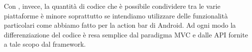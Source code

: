     Con \tisdk{}, invece, la quantità di codice che è possibile
    condividere tra le varie piattaforme è minore soprattutto se intendiamo
    utilizzare delle funzionalità particolari come abbiamo fatto per
    la action bar di Android. Ad ogni modo la differenziazione del codice
    è resa semplice dal paradigma MVC e dalle API fornite a tale scopo dal
    frame\-work.
